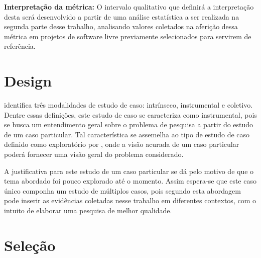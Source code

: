 \textbf{Interpretação da métrica:} O intervalo qualitativo que definirá a interpretação desta será desenvolvido a partir de uma análise estatística a ser realizada na segunda parte desse trabalho, analisando valores coletados na aferição dessa métrica em projetos de software livre previamente selecionados para servirem de referência. 

\section{Design} \label{sec:Design}

 identifica três modalidades de estudo de caso: intrínseco, instrumental e coletivo. Dentre essas definições, este estudo de caso se caracteriza como instrumental, pois se busca um entendimento geral sobre o problema de pesquisa a partir do estudo de um caso particular. Tal característica se assemelha ao tipo de estudo de caso definido como exploratório por , onde a visão acurada de um caso particular poderá fornecer uma visão geral do problema considerado.

A justificativa para este estudo de um caso particular se dá pelo motivo de que o tema abordado foi pouco explorado até o momento. Assim espera-se que este caso único componha um estudo de múltiplos casos, pois segundo  esta abordagem pode inserir as evidências coletadas nesse trabalho em diferentes contextos, com o intuito de elaborar uma pesquisa de melhor qualidade.

\section{Seleção} \label{sec:Seleção}

